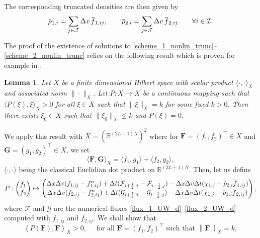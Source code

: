 \documentclass[reqno]{amsart}
\newtheorem{Lemma}{Lemma}
\newcommand{\R}{\mathbb{R}}
\newcommand{\II}{\mathcal{I}}
\newcommand{\J}{\mathcal{J}}
\newcommand{\Fbf}{\mathbf{F}}
\newcommand{\Gbf}{\mathbf{G}}
\newcommand{\iph}{{i+\frac{1}{2}}}
\newcommand{\imh}{{i-\frac{1}{2}}}
\newcommand{\lla}{\left\langle}
\newcommand{\rra}{\right\rangle}
\newcommand{\overbar}[1]{\mkern 1.5mu\overline{\mkern-1.5mu#1\mkern-1.5mu}\mkern 1.5mu}
\numberwithin{equation}{section}
\begin{document}
The corresponding truncated densities are then given by
\begin{equation*}
    \overbar{\rho}_{1,i}=\sum_{j\in\J}\Delta v\,\overbar{f}_{1,ij},\qquad \overbar{\rho}_{2,i}=\sum_{j\in\J}\Delta v\,\overbar{f}_{2,ij} \qquad \forall i\in\II.
\end{equation*}

The proof of the existence of solutions to \eqref{scheme_1_nonlin_trunc}--\eqref{scheme_2_nonlin_trunc} relies on the following result which is proven for example in \cite[Lemma 1.4, Chapter II]{temam1984}.
\begin{Lemma}\label{lem_existence_Navier}
    Let $X$ be a finite dimensional Hilbert space with scalar product $\langle\cdot,\cdot\rangle_X$ and associated norm $\|\cdot\|_X$. Let $P:X\rightarrow X$ be a continuous mapping such that $\langle P(\xi),\xi\rangle_X >0$ for all $\xi\in X$ such that $\|\xi\|_X=k$ for some fixed $k>0$. Then there exists $\xi_0\in X$ such that $\|\xi_0\|_X\leq k$ and $P(\xi)=0$.
\end{Lemma}
We apply this result with $X=\left(\R^{(2L+1)N} \right)^2$ where for $\Fbf=(f_1,f_2)^\top \in X$ and $\Gbf=(g_1,g_2)^\top\in X $, we set
\begin{equation*}
    \langle \Fbf,\Gbf\rangle_X=\langle f_1,g_1\rangle+\langle f_2,g_2\rangle,
\end{equation*}
$\langle \cdot,\cdot \rangle$ being the classical Euclidian dot product on $\R^{(2L+1)N}$.
Then, let us define
\begin{equation*}
    P:\begin{pmatrix} f_1\\f_2 \end{pmatrix}\mapsto
    \begin{pmatrix} \Delta x\Delta v(f_{1,ij}-f_{1,ij}^n)+\Delta t(\mathcal{F}_{\iph,j}-\mathcal{F}_{\imh,j})-\Delta x\Delta v\Delta t(\chi_{1,j}-\overbar{\rho}_{2,i}\overbar{f}_{1,ij})\\ 
    \Delta x\Delta v(f_{2,ij}-f_{2,ij}^n)+\Delta t(\mathcal{G}_{\iph,j}-\mathcal{G}_{\imh,j})-\Delta x\Delta v\Delta t(\chi_{1,j}-\overbar{\rho}_{1,i}\overbar{f}_{2,ij})
    \end{pmatrix},
\end{equation*}
where $\mathcal{F}$ and $\mathcal{G}$ are the numerical fluxes \eqref{flux_1_UW_d}--\eqref{flux_2_UW_d} computed with $f_{1,ij}$ and $f_{2,ij}$. We shall show that
\begin{equation*}
    \lla P(\Fbf), \Fbf \rra_X > 0, \quad \text{ for all } \Fbf=( f_1,f_2)^\top  \text{ such that }\left\|\Fbf\right\|_X=k,
\end{equation*}
\end{document}
